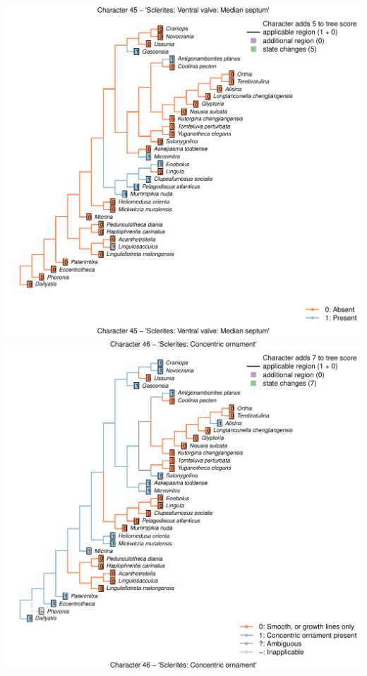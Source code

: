 \documentclass[]{book}
\theoremstyle{definition}
\theoremstyle{definition}
\theoremstyle{definition}
\theoremstyle{remark}
\begin{document}
\includegraphics{Brachiopod_phylogeny_files/figure-latex/unnamed-chunk-4-45.pdf}
\includegraphics{Brachiopod_phylogeny_files/figure-latex/unnamed-chunk-4-46.pdf}
\end{document}
